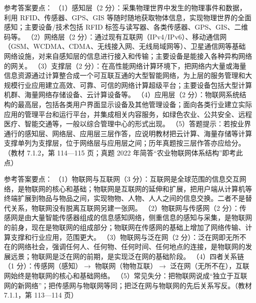 \documentclass[a4paper,11pt]{article}
\begin{document}
\q 参考答案要点：
（1）感知层（2 分）：采集物理世界中发生的物理事件和数据，利用 RFID、传感器、GPS、GIS 等随时随地获取物体信息，实现物理世界的全面感知；主要设备/技术包括 RFID 标签与读写器、各类传感器、GPS、GIS、二维码等。
（2）网络层（2 分）：通过现有互联网（IPv4/IPv6）、移动通信网（GSM、WCDMA、CDMA、无线接入网、无线局域网等）、卫星通信网等基础网络设施，对来自感知层的信息进行接入和传输；主要设备是能接入各种异构网络的网关。
（3）支撑层（2 分）：在高性能网络计算环境下，把网络内大量或海量信息资源通过计算整合成一个可互联互通的大型智能网络，为上层的服务管理和大规模行业应用建立高效、可靠、可信的网络计算超级平台；主要设备包括大型计算机群、海量网络存储设备、云计算设备等。
（4）应用层（2 分）：物联网系统结构的最高层，包括各类用户界面显示设备及其他管理设备；面向各类行业建立实际应用的管理平台和运行平台，并集成相关内容服务，如绿色农业、公共安全、远程医疗、智能交通等，一般以综合管理中心的形式出现。
（5）答题提示：若按业界通行的感知层、网络层、应用层三层作答，应说明教材把云计算、海量存储等计算支撑单列为支撑层，位于网络层与应用层之间；历年真题按三层作答亦应给分。（教材 7.1.2，第 114—115 页；真题 2022 年简答“农业物联网体系结构”即考此点）

\q 参考答案要点：
（1）物联网与互联网（3 分）：互联网是全球范围的信息交互网络，是物联网的核心和基础；物联网是互联网的延伸和扩展，把用户端从计算机等终端扩展到物品与物品之间，实现物物、人物、人人之间的信息交换。二者不是替代关系，物联网没有脱离互联网另建一张网。
（2）物联网与传感网（2 分）：传感网是由大量智能传感器组成的信息感知网络，侧重信息的感知与采集，是物联网的前身，现在是物联网的组成部分；物联网在传感网的基础上增加了网络传输、计算支撑和行业应用，范围更大。
（3）物联网与泛在网（2 分）：泛在网即无所不在的网络社会，强调任何人、任何物、任何时间、任何地点的连接，是物联网的发展远景；物联网是泛在网的前期，是实现泛在网的基础阶段。
（4）四者关系链（1 分）：传感网（感知）$\rightarrow$ 物联网（物物互联）$\rightarrow$ 泛在网（无所不在），互联网始终是物联网的核心和基础网络。
（5）常见失分：把物联网说成“独立于互联网的新网络”；把传感网与物联网等同；把泛在网与物联网的先后关系写反。（教材 7.1.1，第 113—114 页）

\end{document}
